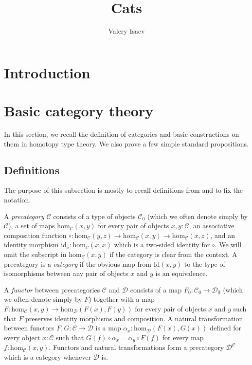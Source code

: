 \documentclass[reqno]{amsart}
\theoremstyle{definition}
\theoremstyle{remark}
\newcommand{\fs}[1]{\mathrm{#1}}
\newcommand{\scat}[1]{\mathcal{#1}}
\renewcommand{\hom}{\fs{hom}}
\newcommand{\id}{\fs{id}}
\newcommand{\Id}{\fs{Id}}
\newcommand{\ob}[1]{#1_0}
\newcommand{\fob}[1]{#1_0}
\numberwithin{figure}{section}
\begin{document}
\title{Cats}

\author{Valery Isaev}

\begin{abstract}
\end{abstract}

\maketitle

\section{Introduction}


\section{Basic category theory}

In this section, we recall the definition of categories and basic constructions on them in homotopy type theory.
We also prove a few simple standard propositions.

\subsection{Definitions}

The purpose of this subsection is mostly to recall definitions from \cite{univalent-cats} and to fix the notation.

A \emph{precategory} $\scat{C}$ consists of a type of objects $\ob{\scat{C}}$ (which we often denote simply by $\scat{C}$), a set of maps $\hom_\scat{C}(x,y)$ for every pair of objects $x,y : \scat{C}$,
an associative composition function $\circ : \hom_\scat{C}(y,z) \to \hom_\scat{C}(x,y) \to \hom_\scat{C}(x,z)$, and an identity morphism $\id_x : \hom_\scat{C}(x,x)$ which is a two-sided identity for $\circ$.
We will omit the subscript in $\hom_\scat{C}(x,y)$ if the category is clear from the context.
A precategory is a \emph{category} if the obvious map from $\Id(x,y)$ to the type of isomorphisms between any pair of objects $x$ and $y$ is an equivalence.

A \emph{functor} between precategories $\scat{C}$ and $\scat{D}$ consists of a map $\fob{F} : \ob{\scat{C}} \to \ob{\scat{D}}$ (which we often denote simply by $F$)
together with a map $F : \hom_\scat{C}(x,y) \to \hom_\scat{D}(F(x),F(y))$ for every pair of objects $x$ and $y$ such that $F$ preserves identity morphisms and composition.
A natural transformation between functors $F,G : \scat{C} \to \scat{D}$ is a map $\alpha_x : \hom_\scat{D}(F(x),G(x))$ defined for every object $x : \scat{C}$ such that $G(f) \circ \alpha_x = \alpha_y \circ F(f)$ for every map $f : \hom_\scat{C}(x,y)$.
Functors and natural transformations form a precategory $\scat{D}^\scat{C}$ which is a category whenever $\scat{D}$ is.
\end{document}
